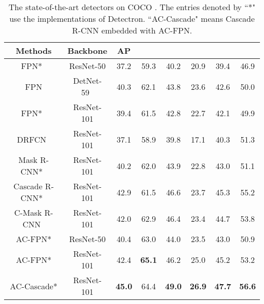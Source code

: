 \documentclass[journal]{IEEEtran}
\def\qcr{\fontfamily{qcr}\selectfont}
\begin{document}
	
	\begin{table*}[t]
		\centering
		\caption{The state-of-the-art 
detectors on COCO {\qcr{test-dev}}. The entries denoted by ``*" use the implementations of Detectron\cite{girshick2018detectron}. ``AC-Cascade" means Cascade R-CNN embedded with AC-FPN.}
{
			\begin{tabular}{c|c|cccccc}
				\toprule
				Methods &  Backbone & AP  &  &  &  &  &  \\
				\hline
				FPN*~\cite{lin2017feature} & ResNet-50 & 37.2 & 59.3  & 40.2  &  20.9 & 39.4  & 46.9  \\
				FPN & DetNet-59~\cite{li2018detnet} & 40.3 & 62.1 & 43.8 & 23.6 & 42.6 & 50.0  \\
				\hline
				FPN*~\cite{lin2017feature} & ResNet-101 & 39.4 & 61.5  &  42.8  & 22.7 & 42.1 & 49.9 \\
				DRFCN~\cite{dai2017deformable} & ResNet-101 & 37.1 & 58.9 & 39.8 & 17.1 & 40.3 & 51.3  \\     
				Mask R-CNN*~\cite{he2017mask} & ResNet-101 &  40.2 & 62.0 & 43.9 & 22.8   & 43.0 & 51.1  \\
				Cascade R-CNN*~\cite{cai2018cascade} &  ResNet-101 & 42.9 & 61.5 & 46.6  & 23.7  & 45.3 &  55.2 \\
				C-Mask R-CNN~\cite{chen2018context} & ResNet-101 & 42.0 & 62.9 & 46.4 & 23.4 & 44.7 & 53.8 \\
				\hline
				AC-FPN* & ResNet-50 &  40.4 & 63.0 & 44.0 & 23.5 & 43.0 & 50.9  \\
				AC-FPN* & ResNet-101 & 42.4  & \textbf{65.1} & 46.2 & 25.0 & 45.2 & 53.2  \\
				AC-Cascade* & ResNet-101 & \textbf{45.0}  & 64.4 & \textbf{49.0}  &  \textbf{26.9} &  \textbf{47.7} & \textbf{56.6} \\
				\bottomrule
		\end{tabular}}
\label{tab:state-of-the-art}\end{table*}
\end{document}
